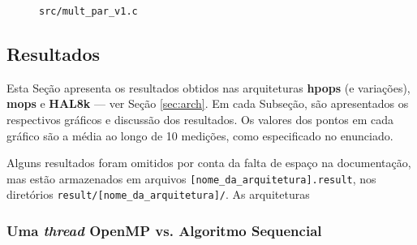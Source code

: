\documentclass[a4paper, 12pt]{article}
\begin{document}
\begin{figure}[H]
    \centering
    
    \caption{\texttt{src/mult\_par\_v1.c}}
    \label{fig:par_v1}
\end{figure}

\subsection{Resultados} \label{sec:res}

Esta Seção apresenta os resultados obtidos nas arquiteturas \textbf{hpops}
(e variações), \textbf{mops} e \textbf{HAL8k} --- ver Seção \ref{sec:arch}.
Em cada Subseção, são apresentados os respectivos gráficos e discussão dos
resultados. Os valores dos pontos em cada gráfico são a média ao longo de
10 medições, como especificado no enunciado.

Alguns resultados foram omitidos por conta da falta de espaço na
documentação, mas estão armazenados em arquivos
\texttt{[nome\_da\_arquitetura].result}, nos diretórios
\texttt{result/[nome\_da\_arquitetura]/}. As arquiteturas

\subsubsection{Uma \textit{thread} OpenMP vs. Algoritmo Sequencial}
\end{document}
